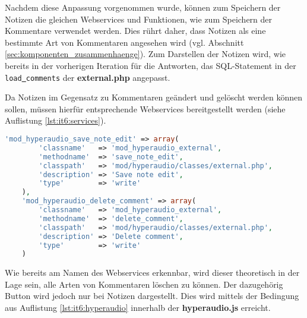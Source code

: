 Nachdem diese Anpassung vorgenommen wurde, können zum Speichern der Notizen die gleichen Webservices und Funktionen, wie zum Speichern der Kommentare verwendet werden. Dies rührt daher, dass Notizen als eine bestimmte Art von Kommentaren angesehen wird (vgl. Abschnitt \ref{sec:komponenten_zusammenhaenge}). Zum Darstellen der Notizen wird, wie bereits in der vorherigen Iteration für die Antworten, das SQL-Statement in der \texttt{load\underline{{ }}comments} der \textbf{external.php} angepasst.

Da Notizen im Gegensatz zu Kommentaren geändert und gelöscht werden können sollen, müssen hierfür entsprechende Webservices bereitgestellt werden (siehe Auflistung \ref{lst:it6:services}).

\begin{lstlisting}[language=php,
             linewidth=\textwidth,
             caption={Ausschnitt der \textbf{services.php} in der 6. Iteration},
             label={lst:it6:services}]
    'mod_hyperaudio_save_note_edit' => array(
        'classname'   => 'mod_hyperaudio_external',
        'methodname'  => 'save_note_edit',
        'classpath'   => 'mod/hyperaudio/classes/external.php',
        'description' => 'Save note edit',
        'type'        => 'write'
    ),
    'mod_hyperaudio_delete_comment' => array(
        'classname'   => 'mod_hyperaudio_external',
        'methodname'  => 'delete_comment',
        'classpath'   => 'mod/hyperaudio/classes/external.php',
        'description' => 'Delete comment',
        'type'        => 'write'
    )
\end{lstlisting}

 Wie bereits am Namen des Webservices erkennbar, wird dieser theoretisch in der Lage sein, alle Arten von Kommentaren löschen zu können. Der dazugehörig Button wird jedoch nur bei Notizen dargestellt. Dies wird mittels der Bedingung aus Auflistung \ref{lst:it6:hyperaudio} innerhalb der \textbf{hyperaudio.js} erreicht.
 
